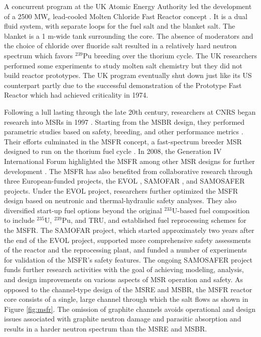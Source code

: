 A concurrent program at the UK Atomic Energy Authority led the
development of a 2500 MW$_{\text{e}}$ lead-cooled Molten Chloride Fast Reactor
concept \cite{smith_assessment_1974}. It is a dual fluid system,
with separate loops for the fuel salt and the blanket salt. The blanket is a
1 m-wide tank surrounding the core. The absence of moderators and the choice
of chloride over fluoride salt resulted in a relatively hard neutron spectrum
which favors $^{239}$Pu breeding over the thorium cycle. The UK researchers
performed some experiments to study molten salt chemistry but they did not
build reactor prototypes. The UK program eventually shut down just like its
US counterpart partly due to the successful demonstration of the Prototype
Fast Reactor which had achieved criticality in 1974.

Following a lull lasting through the late 20th century, researchers at
\gls{CNRS} began research into \glspl{MSR} in 1997
\cite{heuer_simulation_2010}. Starting from the \gls{MSBR} design, they
performed parametric studies based on safety, breeding, and
other performance metrics \cite{mathieu_thorium_2006}. Their efforts
culminated in the \gls{MSFR} concept, a fast-spectrum breeder \gls{MSR}
designed to run on the thorium fuel cycle \cite{merle_optimized_2007}. In
2008, the Generation IV International Forum highlighted the \gls{MSFR} among
other \gls{MSR} designs for further development \cite{gif_generation_2008}.
The \gls{MSFR} has also benefited from collaborative research through three
European-funded projects, the \gls{EVOL} \cite{euratom_final_2015},
\gls{SAMOFAR} \cite{kloosterman_20_2017}, and \gls{SAMOSAFER}
\cite{cordis_severe_nodate} projects. Under the \gls{EVOL}
project, researchers further optimized the \gls{MSFR} design based on
neutronic and thermal-hydraulic safety analyses. They also diversified
start-up fuel options beyond the original $^{233}$U-based fuel composition to
include $^{235}$U, $^{239}$Pu, and \gls{TRU}, and established fuel
reprocessing schemes for the \gls{MSFR}. The \gls{SAMOFAR} project, which
started approximately two years after the end of the \gls{EVOL} project,
supported more comprehensive safety assessments of the reactor and the
reprocessing plant, and funded a number of experiments for validation of the
\gls{MSFR}'s safety features. The ongoing \gls{SAMOSAFER} project funds further
research activities with the goal of achieving modeling, analysis, and
design improvements on various aspects of \gls{MSR} operation and safety. As
opposed to the channel-type design of the \gls{MSRE} and \gls{MSBR}, the
\gls{MSFR} reactor core consists of a single, large channel through which the
salt flows as shown in Figure \ref{fig:msfr}. The omission of graphite channels
avoids operational and design issues associated with graphite neutron damage
and parasitic absorption and results in
a harder neutron spectrum than the \gls{MSRE} and \gls{MSBR}.

